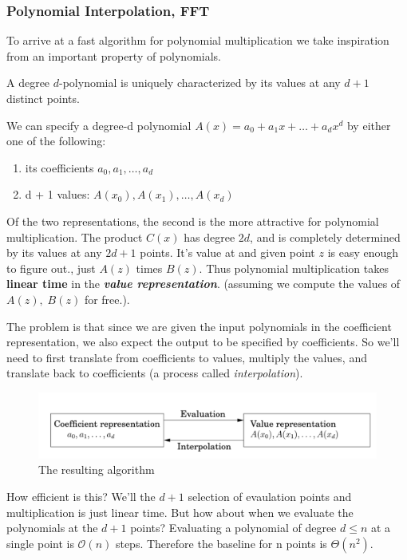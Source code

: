 \documentclass[12pt]{article}
\renewcommand{\O}{\mathcal{O}}
\begin{document}
\subsubsection{Polynomial Interpolation, FFT}
To arrive at a fast algorithm for polynomial multiplication we take inspiration from an important property of polynomials.
\begin{lemma}
    A degree $d$-polynomial is uniquely characterized by its values at any $d + 1$ distinct points.

    We can specify a degree-d polynomial $A(x) = a_0 + a_1 x + \dots + a_d x^d$ by either one of the following:
    \begin{enumerate}
        \item its coefficients $a_0, a_1, \dots , a_d$
        \item d + 1 values: $A(x_0), A(x_1), \dots, A(x_d)$
    \end{enumerate}
\end{lemma}
Of the two representations, the second is the more attractive for polynomial multiplication. The product $C(x)$ has degree $2d$, and is completely determined by its values at any $2d + 1$ points. It's value at and given point $z$ is easy enough to figure out., just $A(z)$ times $B(z)$. Thus polynomial multiplication takes \textbf{linear time} in the \textbf{\emph{value representation}}. (assuming we compute the values of $A(z), \; B(z)$ for free.).

The problem is that since we are given the input polynomials in the coefficient representation, we also expect the output to be specified by coefficients. So we'll need to first translate from coefficients to values, multiply the values, and translate back to coefficients (a process called \emph{interpolation}).

\begin{figure}[h]
    \centering
    \includegraphics[scale=0.7]{images/poly-mult-algo.png}
    \caption{The resulting algorithm}
\end{figure}

How efficient is this? We'll the $d + 1$ selection of evaulation points and multiplication is just linear time. But how about when we evaluate the polynomials at the $d + 1$ points? Evaluating a polynomial of degree $d \le n$ at a single point is $\O(n)$ steps. Therefore the baseline for n points is $\Theta(n^2)$.
\end{document}

